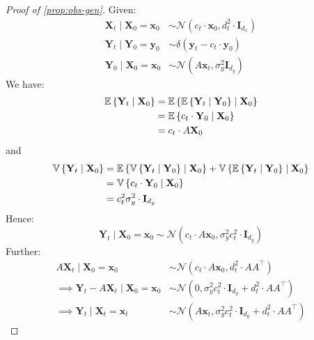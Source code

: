 \begin{proof}[Proof of \autoref{prop:obs-gen}] \label{prf:obs-generation}
    Given:
    \begin{align*}
        \mathbf{X}_t \mid \mathbf{X}_0 = \mathbf{x}_0 &\sim \mathcal{N}(c_t\cdot\mathbf{x}_0, d_t^2\cdot\mathbf{I}_{d_x}) \\
        \mathbf{Y}_t \mid \mathbf{Y}_0 = \mathbf{y}_0 &\sim \delta(\mathbf{y}_t - c_t\cdot \mathbf{y}_0) \\
        \mathbf{Y}_0 \mid \mathbf{X}_0 = \mathbf{x}_0 &\sim \mathcal{N}(A\mathbf{x}_t, \sigma_y^2\mathbf{I}_{d_y})
    \end{align*}
    We have:
    \begin{align*}
        \mathbb{E} \left\{ \mathbf{Y}_t \mid \mathbf{X}_0 \right\} &= \mathbb{E} \left\{ \mathbb{E} \left\{ \mathbf{Y}_t \mid \mathbf{Y}_0 \right\} \mid \mathbf{X}_0 \right\} \\
        &= \mathbb{E} \left\{ c_t\cdot \mathbf{Y}_0 \mid \mathbf{X}_0 \right\} \\
        &= c_t\cdot A\mathbf{X}_0
    \end{align*}
    and
    \begin{align*}
        \mathbb{V} \left\{ \mathbf{Y}_t \mid \mathbf{X}_0 \right\} &= \mathbb{E} \left\{ \mathbb{V} \left\{ \mathbf{Y}_t \mid \mathbf{Y}_0 \right\} \mid \mathbf{X}_0 \right\} + \mathbb{V} \left\{ \mathbb{E} \left\{ \mathbf{Y}_t \mid \mathbf{Y}_0 \right\} \mid \mathbf{X}_0 \right\} \\
        &= \mathbb{V} \left\{ c_t\cdot \mathbf{Y}_0 \mid \mathbf{X}_0 \right\} \\
        &= c_t^2\sigma_y^2\cdot \mathbf{I}_{d_y}
    \end{align*}
    Hence:
    \begin{equation*}
        \mathbf{Y}_t \mid \mathbf{X}_0 = \mathbf{x}_0 \sim \mathcal{N}(c_t\cdot A\mathbf{x}_0, \sigma_y^2c_t^2\cdot \mathbf{I}_{d_y})
    \end{equation*}
    Further:
    \begin{align*}
        A\mathbf{X}_t \mid \mathbf{X}_0 = \mathbf{x}_0 &\sim \mathcal{N}(c_t\cdot A\mathbf{x}_0, d_t^2\cdot AA^\top) \\
        \implies \mathbf{Y}_t - A\mathbf{X}_t \mid \mathbf{X}_0 = \mathbf{x}_0 &\sim \mathcal{N}(0, \sigma_y^2c_t^2\cdot \mathbf{I}_{d_y} + d_t^2\cdot AA^\top) \\
        \implies \mathbf{Y}_t \mid \mathbf{X}_t = \mathbf{x}_t &\sim \mathcal{N}(A\mathbf{x}_t, \sigma_y^2c_t^2\cdot \mathbf{I}_{d_y} + d_t^2\cdot AA^\top)
    \end{align*}

\end{proof}

